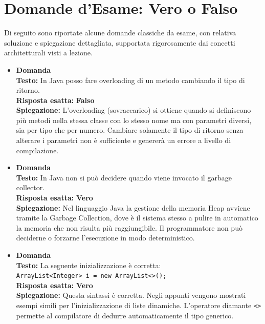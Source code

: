 \documentclass[12pt, a4paper]{article}
\begin{document}
\newpage

\section{Domande d'Esame: Vero o Falso}
Di seguito sono riportate alcune domande classiche da esame, con relativa soluzione e spiegazione dettagliata, supportata rigorosamente dai concetti architetturali visti a lezione.
\setcounter{domanda}{0}

\begin{itemize}
    \item {}\textbf{Domanda \thedomanda} \\
    \textbf{Testo:} In Java posso fare overloading di un metodo cambiando il tipo di ritorno. \\
    \textbf{Risposta esatta:} \textbf{Falso} \\
    \textbf{Spiegazione:} L'overloading (sovraccarico) si ottiene quando si definiscono più metodi nella stessa classe con lo stesso nome ma con parametri diversi, sia per tipo che per numero. Cambiare solamente il tipo di ritorno senza alterare i parametri non è sufficiente e genererà un errore a livello di compilazione.
    \vspace{0.3cm}

    \item {}\textbf{Domanda \thedomanda} \\
    \textbf{Testo:} In Java non si può decidere quando viene invocato il garbage collector. \\
    \textbf{Risposta esatta:} \textbf{Vero} \\
    \textbf{Spiegazione:} Nel linguaggio Java la gestione della memoria Heap avviene tramite la Garbage Collection, dove è il sistema stesso a pulire in automatico la memoria che non risulta più raggiungibile. Il programmatore non può deciderne o forzarne l'esecuzione in modo deterministico.
    \vspace{0.3cm}

    \item {}\textbf{Domanda \thedomanda} \\
    \textbf{Testo:} La seguente inizializzazione è corretta:\\ \verb|ArrayList<Integer> i = new ArrayList<>();| \\
    \textbf{Risposta esatta:} \textbf{Vero} \\
    \textbf{Spiegazione:} Questa sintassi è corretta. Negli appunti vengono mostrati esempi simili per l'inizializzazione di liste dinamiche. L'operatore diamante \verb|<>| permette al compilatore di dedurre automaticamente il tipo generico.
    \vspace{0.3cm}


\end{itemize}
\end{document}
